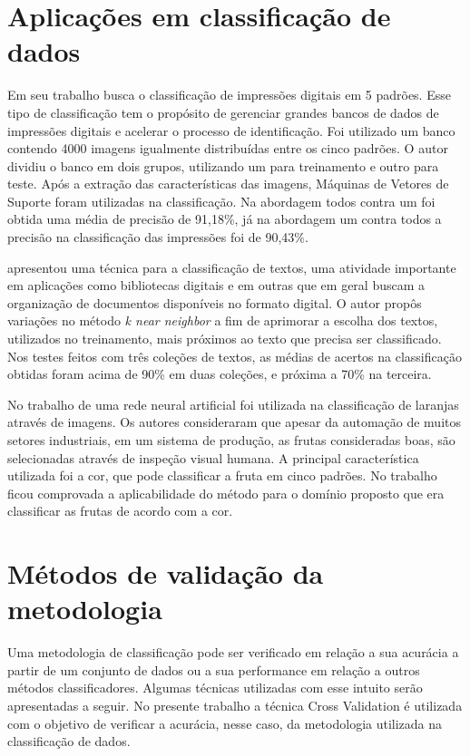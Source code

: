 \section{Aplicações em classificação de dados}
Em seu trabalho  busca o classificação de impressões digitais em 5 padrões. Esse tipo de classificação tem o propósito de gerenciar grandes bancos de dados de impressões digitais e acelerar o processo de identificação. Foi utilizado um banco contendo 4000 imagens igualmente distribuídas entre os cinco padrões. O autor dividiu o banco em dois grupos, utilizando um para treinamento e outro para teste. Após a extração das características das imagens, Máquinas de Vetores de Suporte foram utilizadas na classificação. Na abordagem todos contra um foi obtida uma média de precisão de 91,18\%, já na abordagem um contra todos a precisão na classificação das impressões foi de 90,43\%.

 apresentou uma técnica para a classificação de textos, uma atividade importante em aplicações como bibliotecas digitais e em outras que em geral buscam a organização de documentos disponíveis no formato digital. O autor propôs variações no método \textit{k near neighbor} a fim de  aprimorar a escolha dos textos, utilizados no treinamento, mais próximos ao texto que precisa ser classificado. Nos testes feitos com três coleções de textos, as médias de acertos na classificação obtidas foram acima de 90\% em duas coleções, e próxima a 70\% na terceira.

No trabalho de  uma rede neural artificial foi utilizada na classificação de laranjas através de imagens. Os autores consideraram que apesar da automação de muitos setores industriais, em um sistema de produção, as frutas consideradas boas, são selecionadas através de inspeção visual humana. A principal característica utilizada foi a cor, que pode classificar a fruta em cinco padrões. No trabalho ficou comprovada a aplicabilidade do método para o domínio proposto que era classificar as frutas de acordo com a cor.

\section{Métodos de validação da metodologia}
Uma metodologia de classificação pode ser verificado em relação a sua acurácia a partir de um conjunto de dados ou a sua performance em relação a outros métodos classificadores. Algumas técnicas utilizadas com esse intuito serão apresentadas a seguir. No presente trabalho a técnica Cross Validation é utilizada com o objetivo de verificar a acurácia, nesse caso, da metodologia utilizada na classificação de dados.

